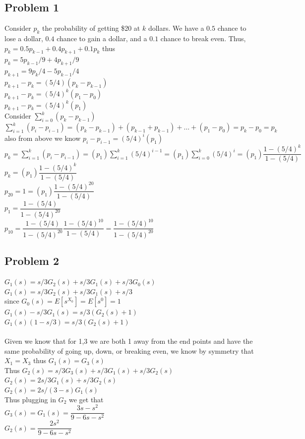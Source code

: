 \documentclass[12pt, letterpaper]{article}
\theoremstyle{definition}
\begin{document}
\pagestyle{fancy}
\fancyhf{}
\fancyhead[ROE]{\thepage}

\subsection*{Problem 1}
Consider $p_k$ the probability of getting \$20 at $k$ dollars. We have a $0.5$ chance to lose a dollar, $0.4$ 
chance to gain a dollar, and a $0.1$ chance to break even. Thus, $p_k=0.5p_{k-1}+0.4p_{k+1}+0.1p_k$ thus\\
$p_k=5p_{k-1}/9+4p_{k+1}/9$\\
$p_{k+1}=9p_k/4-5p_{k-1}/4$\\
$p_{k+1}-p_k=(5/4)(p_{k}-p_{k-1})$\\
$p_{k+1}-p_k=(5/4)^{k}(p_1-p_0)$\\
$p_{k+1}-p_k=(5/4)^{k}(p_1)$\\
Consider $\sum\limits_{i=0}^k(p_{k}-p_{k-1})$\\
$\sum\limits_{i=1}^k(p_{i}-p_{i-1})=(p_k-p_{k-1})+(p_{k-1}+p_{k-1})+\dots+(p_1-p_0)=p_k-p_0=p_k$ also from above we know $p_i-p_{i-1}=(5/4)^i(p_1)$\\
$p_k=\sum\limits_{i=1}^k(p_{i}-p_{i-1})=(p_1)\sum\limits_{i=1}^k(5/4)^{i-1}=(p_1)\sum\limits_{i=0}^k(5/4)^{i}=(p_1)\dfrac{1-(5/4)^k}{1-(5/4)}$\\
$p_k=(p_1)\dfrac{1-(5/4)^k}{1-(5/4)}$\\
$p_{20}=1=(p_1)\dfrac{1-(5/4)^{20}}{1-(5/4)}$\\
$p_1=\dfrac{1-(5/4)}{1-(5/4)^{20}}$\\
$p_{10}=\dfrac{1-(5/4)}{1-(5/4)^{20}}\dfrac{1-(5/4)^{10}}{1-(5/4)}=\dfrac{1-(5/4)^{10}}{1-(5/4)^{20}}$

\newpage
\subsection*{Problem 2}
$G_1(s)=s/3G_2(s)+s/3G_1(s)+s/3G_0(s)$\\
$G_1(s)=s/3G_2(s)+s/3G_1(s)+s/3$\\ since $G_0(s)=E[s^{X_0}]=E[s^0]=1$\\
$G_1(s)-s/3G_1(s)=s/3(G_2(s)+1)$\\
$G_1(s)(1-s/3)=s/3(G_2(s)+1)$\\
\phantom{text}\\
Given we know that for 1,3 we are both 1 away from the end points and have the same probability of going up, down, or breaking even, we know by symmetry that $X_1=X_3$ thus $G_1(s)=G_3(s)$\\
Thus $G_2(s)=s/3G_3(s)+s/3G_1(s)+s/3G_2(s)$\\
$G_2(s)=2s/3G_1(s)+s/3G_2(s)$\\
$G_2(s)=2s/(3-s)G_1(s)$\\
Thus plugging in $G_2$ we get that\\
$G_3(s)=G_1(s)=\dfrac{3s-s^2}{9-6s-s^2}$\\
$G_2(s)=\dfrac{2s^2}{9-6s-s^2}$
\end{document}
